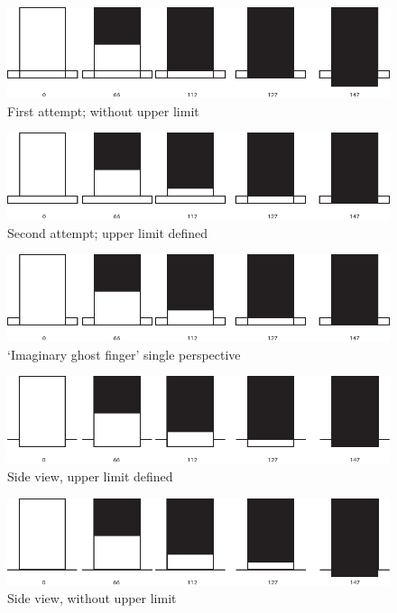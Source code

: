 \begin{figure}
\includegraphics[width=\linewidth]{./resources/Asset4.pdf}
\caption{First attempt; without upper limit}\label{fig:Asset4}
\end{figure}

\begin{figure}
\includegraphics[width=\linewidth]{./resources/Asset5.pdf}
\caption{Second attempt; upper limit defined}\label{fig:Asset5}
\end{figure}

\begin{figure}
\includegraphics[width=\linewidth]{./resources/Asset6.pdf}
\caption{`Imaginary ghost finger' single perspective}\label{fig:Asset6}
\end{figure}

\begin{figure}
\includegraphics[width=\linewidth]{./resources/Asset7.pdf}
\caption{Side view, upper limit defined}\label{fig:Asset7}
\end{figure}

\begin{figure}
\includegraphics[width=\linewidth]{./resources/Asset9.pdf}
\caption{Side view, without upper limit}\label{fig:Asset9}
\end{figure}
